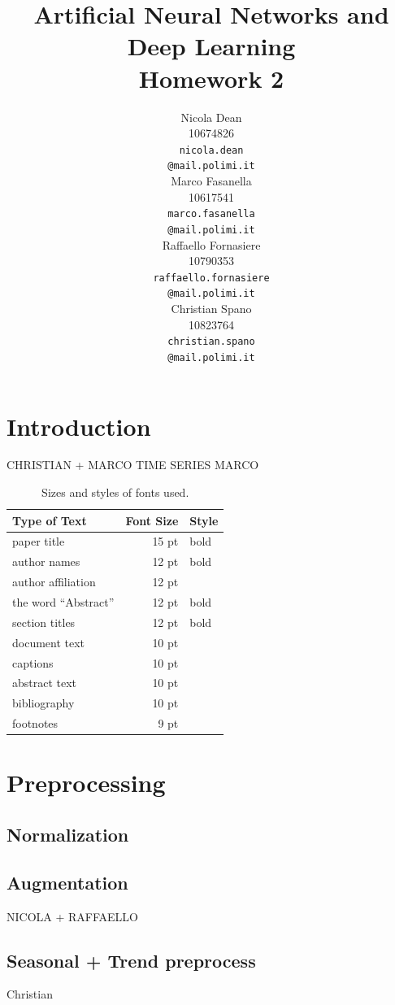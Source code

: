 \documentclass[11pt]{article}
\title{Artificial Neural Networks and Deep Learning \\
Homework 2}
\author{
  Nicola Dean \\
  10674826 \\
  {\tt nicola.dean \\
  \tt @mail.polimi.it} \\\And
  Marco Fasanella \\
  10617541 \\
  {\tt marco.fasanella \\
  \tt @mail.polimi.it} \\\And
  Raffaello Fornasiere \\
    10790353 \\
    {\tt raffaello.fornasiere \\
    \tt @mail.polimi.it} \\\And
  Christian Spano \\
  10823764 \\
  {\tt christian.spano \\
  \tt @mail.polimi.it} \\}
\date{}
\begin{document}
\maketitle


\section{Introduction}


CHRISTIAN + MARCO
TIME SERIES MARCO
\begin{table}[h]
\begin{center}
\begin{tabular}{|l|rl|}
\hline \bf Type of Text & \bf Font Size & \bf Style \\ \hline
paper title & 15 pt & bold \\
author names & 12 pt & bold \\
author affiliation & 12 pt & \\
the word ``Abstract'' & 12 pt & bold \\
section titles & 12 pt & bold \\
document text & 10 pt  &\\
captions & 10 pt & \\
abstract text & 10 pt & \\
bibliography & 10 pt & \\
footnotes & 9 pt & \\
\hline
\end{tabular}
\end{center}
\caption{\label{fontsizes} Sizes and styles of fonts used.}
\end{table}




\section{Preprocessing}
\subsection{Normalization}

\subsection{Augmentation}
NICOLA + RAFFAELLO
\subsection{Seasonal + Trend preprocess}
Christian
\end{document}
